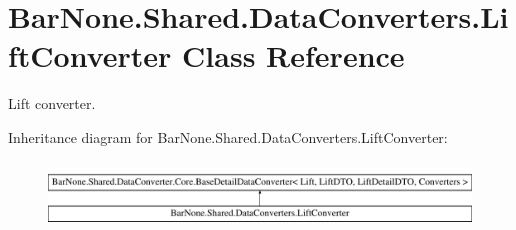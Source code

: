 \hypertarget{class_bar_none_1_1_shared_1_1_data_converters_1_1_lift_converter}{}\section{Bar\+None.\+Shared.\+Data\+Converters.\+Lift\+Converter Class Reference}
\label{class_bar_none_1_1_shared_1_1_data_converters_1_1_lift_converter}


Lift converter.  


Inheritance diagram for Bar\+None.\+Shared.\+Data\+Converters.\+Lift\+Converter\+:\begin{figure}[H]
\begin{center}
\leavevmode
\includegraphics[height=1.777778cm]{class_bar_none_1_1_shared_1_1_data_converters_1_1_lift_converter}
\end{center}
\end{figure}
